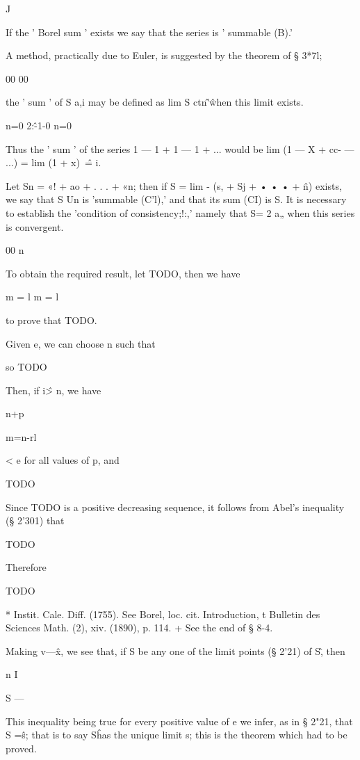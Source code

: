 J

If the ' Borel sum ' exists we say that the series is ' summable (B).'

 A method, practically due
to Euler, is suggested by the theorem of § 3*7l;

00 00

the ' sum ' of S a,i may be defined as lim S ctn\^'\^ when this limit
exists.

n=0 2:\^-1-0 n=0

Thus the ' sum ' of the series 1 — 1 + 1 — 1 + ... would be lim (1 — X
+ cc- — ...) = lim (1 + x)~\^ = i.


Let Sn = «! + ao + . . . + «n; then if S = lim - (s, + Sj + • • • +
\^n) exists, we say that S Un is 'summable (C'l),' and that its sum
(CI) is S. It is necessary to establish the 'condition of
consistency;!:,' namely that S= 2 a„ when this series is convergent.

00 n

To obtain the required result, let TODO, then we have

m = l m = l

to prove that TODO.

Given e, we can choose n such that

so TODO

Then, if i\^ > n, we have

n+p


m=n-rl

< e for all values of p, and

TODO

Since TODO is a positive decreasing sequence, it follows from Abel's
inequality (§ 2'301) that

TODO

Therefore

TODO

* Instit. Cale. Diff. (1755). See Borel, loc. cit. Introduction, t
Bulletin des Sciences Math. (2), xiv. (1890), p. 114. + See the end of
§ 8-4.

%
%
Making v—\^x, we see that, if S be any one of the limit points (§
2'21) of S\^, then

n I

S — %

This inequality being true for every positive value of e we infer, as
in § 2"21, that S =\^s; that is to say S\^ has the unique limit s;
this is the theorem which had to be proved.


